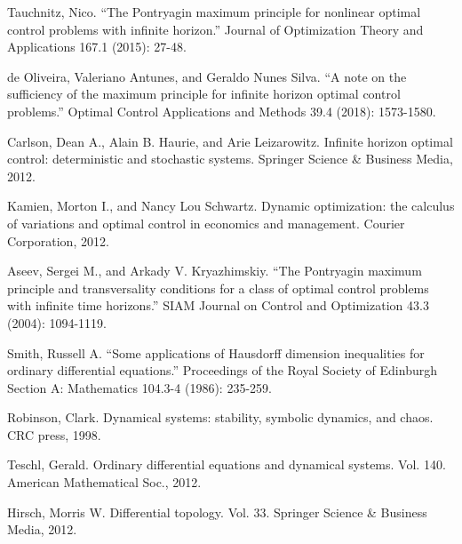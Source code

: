 \documentclass[11pt,reqno]{amsart}
\begin{document}
\begin{thebibliography}{99}
Tauchnitz, Nico. ``The Pontryagin maximum principle for nonlinear optimal control problems with infinite horizon.'' Journal of Optimization Theory and Applications 167.1 (2015): 27-48.


de Oliveira, Valeriano Antunes, and Geraldo Nunes Silva. ``A note on the sufficiency of the maximum principle for infinite horizon optimal control problems.'' Optimal Control Applications and Methods 39.4 (2018): 1573-1580.


 Carlson, Dean A., Alain B. Haurie, and Arie Leizarowitz. Infinite horizon optimal control: deterministic and stochastic systems. Springer Science \& Business Media, 2012.

Kamien, Morton I., and Nancy Lou Schwartz. Dynamic optimization: the calculus of variations and optimal control in economics and management. Courier Corporation, 2012.

Aseev, Sergei M., and Arkady V. Kryazhimskiy. ``The Pontryagin maximum principle and transversality conditions for a class of optimal control problems with infinite time horizons.'' SIAM Journal on Control and Optimization 43.3 (2004): 1094-1119.

Smith, Russell A. ``Some applications of Hausdorff dimension inequalities for ordinary differential equations.'' Proceedings of the Royal Society of Edinburgh Section A: Mathematics 104.3-4 (1986): 235-259.

Robinson, Clark. Dynamical systems: stability, symbolic dynamics, and chaos. CRC press, 1998.

Teschl, Gerald. Ordinary differential equations and dynamical systems. Vol. 140. American Mathematical Soc., 2012.

Hirsch, Morris W. Differential topology. Vol. 33. Springer Science \& Business Media, 2012.



 \end{thebibliography}
 
 
\end{document}
